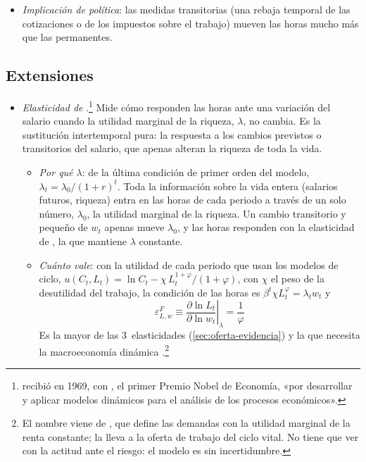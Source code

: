 \documentclass[11pt]{article}
\begin{document}
\begin{itemize}
\item \emph{Implicación de política}: las medidas transitorias (una rebaja temporal de las cotizaciones o de los impuestos sobre el trabajo) mueven las horas mucho más que las permanentes.
\end{itemize}

\subsection{Extensiones}\label{sec:lr-extensiones}

\begin{itemize}
\item \emph{Elasticidad de }.\footnote{ recibió en 1969, con , el primer Premio Nobel de Economía, «por desarrollar y aplicar modelos dinámicos para el análisis de los procesos económicos»\nocite{Nobel1969}.} Mide cómo responden las horas ante una variación del salario cuando la utilidad marginal de la riqueza, $\lambda$, no cambia. Es la sustitución intertemporal pura: la respuesta a los cambios previstos o transitorios del salario, que apenas alteran la riqueza de toda la vida.
  \begin{itemize}
  \item \emph{Por qué $\lambda$}: de la última condición de primer orden del modelo, $\lambda_t=\lambda_0/(1+r)^t$. Toda la información sobre la vida entera (salarios futuros, riqueza) entra en las horas de cada periodo a través de un solo número, $\lambda_0$, la utilidad marginal de la riqueza. Un cambio transitorio y pequeño de $w_t$ apenas mueve $\lambda_0$, y las horas responden con la elasticidad de , la que mantiene $\lambda$ constante.
  \item \emph{Cuánto vale}: con la utilidad de cada periodo que usan los modelos de ciclo, $u(C_t,L_t)=\ln C_t-\chi\,L_t^{1+\varphi}/(1+\varphi)$, con $\chi$ el peso de la desutilidad del trabajo, la condición de las horas es $\beta^{t}\chi L_t^{\varphi}=\lambda_t w_t$ y
  \begin{equation}
  \varepsilon^{F}_{L,w}\equiv\left.\frac{\partial\ln L_t}{\partial\ln w_t}\right|_{\lambda}=\frac{1}{\varphi}\label{eq:frisch}
  \end{equation}
  Es la mayor de las 3~elasticidades (\ref{sec:oferta-evidencia}) y la que necesita la macroeconomía dinámica .\footnote{El nombre viene de \textcite{Frisch1959Complete}, que define las demandas con la utilidad marginal de la renta constante; \textcite{MaCurdy1981Empirical} la lleva a la oferta de trabajo del ciclo vital. No tiene que ver con la actitud ante el riesgo: el modelo es sin incertidumbre.}

\end{itemize}
\end{itemize}
\end{document}
